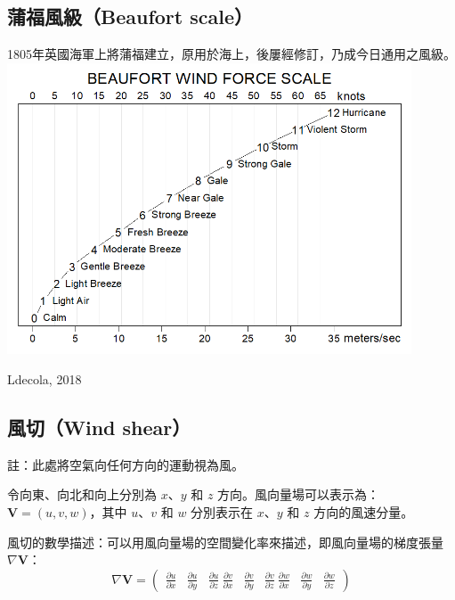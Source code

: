 \documentclass[a4paper,12pt]{report}
\begin{document}
\subsection{蒲福風級（Beaufort scale）}
1805年英國海軍上將蒲福建立，原用於海上，後屢經修訂，乃成今日通用之風級。
\bctf
\includegraphics[width=0.9\textwidth]{Beaufort_wind_scale.png}\caption{Ldecola, 2018}
\efct
\subsection{風切（Wind shear）}
註：此處將空氣向任何方向的運動視為風。

令向東、向北和向上分別為 \(x\)、\(y\) 和 \(z\) 方向。風向量場可以表示為：\(\mathbf{V} = (u, v, w) \)，其中 \(u\)、\(v\) 和 \(w\) 分別表示在 \(x\)、\(y\) 和 \(z\) 方向的風速分量。

風切的數學描述：可以用風向量場的空間變化率來描述，即風向量場的梯度張量 \(\nabla \mathbf{V}\)：
\[ \nabla \mathbf{V} = \begin{pmatrix} \frac{\partial u}{\partial x} & \frac{\partial u}{\partial y} & \frac{\partial u}{\partial z} \ \frac{\partial v}{\partial x} & \frac{\partial v}{\partial y} & \frac{\partial v}{\partial z} \ \frac{\partial w}{\partial x} & \frac{\partial w}{\partial y} & \frac{\partial w}{\partial z} \end{pmatrix} \]
\end{document}
